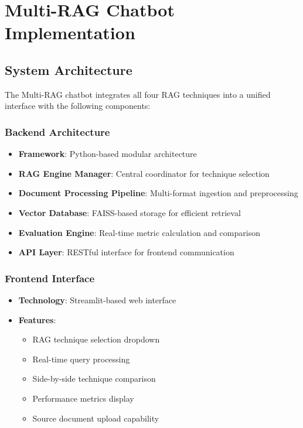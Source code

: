\documentclass[12pt,a4paper]{article}
\begin{document}
\section{Multi-RAG Chatbot Implementation}

\subsection{System Architecture}

The Multi-RAG chatbot integrates all four RAG techniques into a unified interface with the following components:

\subsubsection{Backend Architecture}
\begin{itemize}
    \item \textbf{Framework}: Python-based modular architecture
    \item \textbf{RAG Engine Manager}: Central coordinator for technique selection
    \item \textbf{Document Processing Pipeline}: Multi-format ingestion and preprocessing
    \item \textbf{Vector Database}: FAISS-based storage for efficient retrieval
    \item \textbf{Evaluation Engine}: Real-time metric calculation and comparison
    \item \textbf{API Layer}: RESTful interface for frontend communication
\end{itemize}

\subsubsection{Frontend Interface}
\begin{itemize}
    \item \textbf{Technology}: Streamlit-based web interface
    \item \textbf{Features}: 
    \begin{itemize}
        \item RAG technique selection dropdown
        \item Real-time query processing
        \item Side-by-side technique comparison
        \item Performance metrics display
        \item Source document upload capability
    \end{itemize}
\end{itemize}
\end{document}
